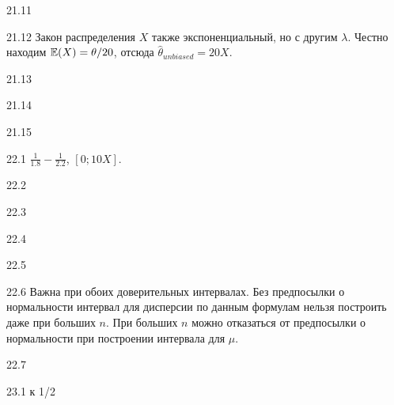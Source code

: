 \protect \hypertarget {soln:21.11}{}
\begin{solution}{{21.11}}

\end{solution}
\protect \hypertarget {soln:21.12}{}
\begin{solution}{{21.12}}
  Закон распределения $X$ также экспоненциальный, но с другим $\lambda$. Честно находим $\mathbb{E}(X)=\theta/20$, отсюда
  $\hat\theta_{unbiased} = 20X$.
\end{solution}
\protect \hypertarget {soln:21.13}{}
\begin{solution}{{21.13}}

\end{solution}
\protect \hypertarget {soln:21.14}{}
\begin{solution}{{21.14}}

\end{solution}
\protect \hypertarget {soln:21.15}{}
\begin{solution}{{21.15}}

\end{solution}
\protect \hypertarget {soln:22.1}{}
\begin{solution}{{22.1}}
  $\frac{1}{1.8} - \frac{1}{2.2}$, $[0;10X]$.
\end{solution}
\protect \hypertarget {soln:22.2}{}
\begin{solution}{{22.2}}
\end{solution}
\protect \hypertarget {soln:22.3}{}
\begin{solution}{{22.3}}
\end{solution}
\protect \hypertarget {soln:22.4}{}
\begin{solution}{{22.4}}
\end{solution}
\protect \hypertarget {soln:22.5}{}
\begin{solution}{{22.5}}
\end{solution}
\protect \hypertarget {soln:22.6}{}
\begin{solution}{{22.6}}
Важна при обоих доверительных интервалах. Без предпосылки о нормальности интервал для дисперсии по данным формулам нельзя построить даже при больших $n$. При больших $n$ можно отказаться от предпосылки о нормальности при построении интервала для $\mu$.
\end{solution}
\protect \hypertarget {soln:22.7}{}
\begin{solution}{{22.7}}
\end{solution}
\protect \hypertarget {soln:23.1}{}
\begin{solution}{{23.1}}
к 1/2
\end{solution}
